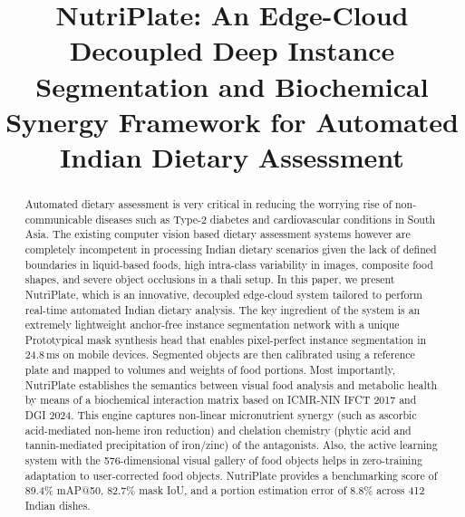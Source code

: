 \documentclass[conference]{IEEEtran}
\begin{document}
\title{NutriPlate: An Edge-Cloud Decoupled Deep Instance Segmentation and Biochemical Synergy Framework for Automated Indian Dietary Assessment}

\author{
}

\maketitle

\begin{abstract}
Automated dietary assessment is very critical in reducing the worrying rise of non-communicable diseases such as Type-2 diabetes and cardiovascular conditions in South Asia. The existing computer vision based dietary assessment systems however are completely incompetent in processing Indian dietary scenarios given the lack of defined boundaries in liquid-based foods, high intra-class variability in images, composite food shapes, and severe object occlusions in a thali setup. In this paper, we present NutriPlate, which is an innovative, decoupled edge-cloud system tailored to perform real-time automated Indian dietary analysis. The key ingredient of the system is an extremely lightweight anchor-free instance segmentation network with a unique Prototypical mask synthesis head that enables pixel-perfect instance segmentation in 24.8\,ms on mobile devices. Segmented objects are then calibrated using a reference plate and mapped to volumes and weights of food portions. Most importantly, NutriPlate establishes the semantics between visual food analysis and metabolic health by means of a biochemical interaction matrix based on ICMR-NIN IFCT 2017 and DGI 2024. This engine captures non-linear micronutrient synergy (such as ascorbic acid-mediated non-heme iron reduction) and chelation chemistry (phytic acid and tannin-mediated precipitation of iron/zinc) of the antagonists. Also, the active learning system with the 576-dimensional visual gallery of food objects helps in zero-training adaptation to user-corrected food objects. NutriPlate provides a benchmarking score of 89.4\% mAP@50, 82.7\% mask IoU, and a portion estimation error of 8.8\% across 412 Indian dishes.
\end{abstract}
\end{document}
